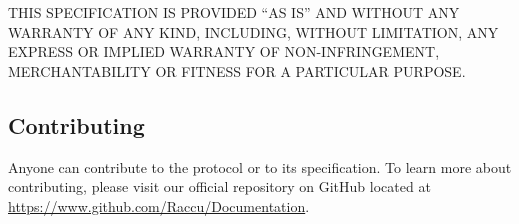     \medskip
    THIS SPECIFICATION IS PROVIDED “AS IS” AND WITHOUT ANY WARRANTY OF ANY KIND, INCLUDING, WITHOUT LIMITATION,
    ANY EXPRESS OR IMPLIED WARRANTY OF NON-INFRINGEMENT, MERCHANTABILITY OR FITNESS FOR A PARTICULAR PURPOSE.

    \subsection{Contributing}
    Anyone can contribute to the protocol or to its specification. To learn more about contributing, please visit our 
    official repository on GitHub located at \href{https://www.github.com/Raccu/Documentation}{https://www.github.com/Raccu/Documentation}.